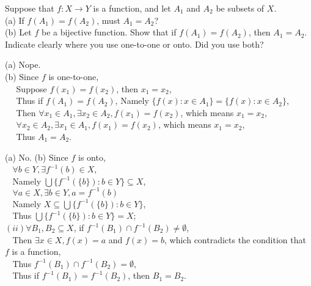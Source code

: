 \documentclass[11pt, a4paper, UTF8]{ctexart}
\begin{document}
\begin{problem}[UD: 16.20]
  Suppose that $f:X \rightarrow Y$ is a function, and let $A_{1}$ and $A_{2}$ be 
  subsets of $X$.\\
  (a) If $f(A_{1}) = f(A_{2})$, must $A_{1} = A_{2}$?\\
  (b) Let $f$ be a bijective function. Show that if $f(A_{1}) = f(A_{2})$, then 
  $A_{1} = A_{2}$. Indicate clearly where you use one-to-one or onto. Did you use 
  both?
\end{problem}

\begin{solution}
  (a) Nope.\\
  (b) Since $f$ is one-to-one,\\
  $~~~~~~$Suppose $f(x_{1}) = f(x_{2})$, then $x_{1} = x_{2}$,\\
  $~~~~~~$Thus if $f(A_{1}) = f(A_{2})$, Namely $\{f(x):x \in A_{1}\} 
  = \{f(x):x \in A_{2}\}$,\\
  $~~~~~~$Then $\forall x_{1} \in A_{1}, \exists x_{2} \in A_{2},f(x_{1}) = f(x_{2})$, 
  which means $x_{1} = x_{2}$,\\
  $~~~~~~\forall x_{2} \in A_{2}, \exists x_{1} \in A_{1},f(x_{1}) = f(x_{2})$, 
  which means $x_{1} = x_{2}$,\\
  $~~~~~~$Thus $A_{1} = A_{2}$.
\end{solution}

\begin{problem}[UD: 16.21]
  
\end{problem}

\begin{solution}
  (a) No.
  (b) Since $f$ is onto,\\
  $~~~~\forall b \in Y, \exists f^{-1}(b) \in X$,\\
  $~~~~$Namely $\bigcup \{f^{-1}(\{b\}):b \in Y\} \subseteq X$,\\
  $~~~~\forall a \in X, \exists b \in Y, a = f^{-1}(b)$\\
  $~~~~$Namely $X \subseteq \bigcup \{f^{-1}(\{b\}):b \in Y\}$,\\
  $~~~~$Thus $\bigcup \{f^{-1}(\{b\}):b \in Y\} = X$;\\
  $(ii)\forall B_{1},B_{2} \subseteq X$, if $f^{-1}(B_{1}) \cap f^{-1}(B_{2}) \neq 
  \emptyset$,\\
  $~~~~$Then $\exists x \in X, f(x) = a$ and $f(x) = b$, which contradicts 
  the condition that $f$ is a function,\\
  $~~~~$Thus $f^{-1}(B_{1}) \cap f^{-1}(B_{2}) = \emptyset$,\\
  $~~~~$Thus if $f^{-1}(B_{1}) = f^{-1}(B_{2})$, then $B_{1} = B_{2}$.
\end{solution}
\end{document}
